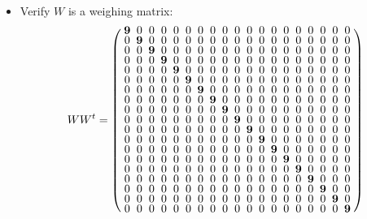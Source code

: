 \documentclass{beamer}
\begin{document}
\begin{frame}

  \begin{itemize}
  \item Verify $W$ is a weighing matrix:
    \[
      WW^t=
      \arraycolsep=2.5pt\def\arraystretch{0.625}
      \left(
        \begin{array}{ccccccccccccccccccc}
          \mathbf{9}&0&0&0&0&0&0&0&0&0&0&0&0&0&0&0&0&0&0\\
          0&\mathbf{9}&0&0&0&0&0&0&0&0&0&0&0&0&0&0&0&0&0\\
          0&0&\mathbf{9}&0&0&0&0&0&0&0&0&0&0&0&0&0&0&0&0\\
          0&0&0&\mathbf{9}&0&0&0&0&0&0&0&0&0&0&0&0&0&0&0\\
          0&0&0&0&\mathbf{9}&0&0&0&0&0&0&0&0&0&0&0&0&0&0\\
          0&0&0&0&0&\mathbf{9}&0&0&0&0&0&0&0&0&0&0&0&0&0\\
          0&0&0&0&0&0&\mathbf{9}&0&0&0&0&0&0&0&0&0&0&0&0\\
          0&0&0&0&0&0&0&\mathbf{9}&0&0&0&0&0&0&0&0&0&0&0\\
          0&0&0&0&0&0&0&0&\mathbf{9}&0&0&0&0&0&0&0&0&0&0\\
          0&0&0&0&0&0&0&0&0&\mathbf{9}&0&0&0&0&0&0&0&0&0\\
          0&0&0&0&0&0&0&0&0&0&\mathbf{9}&0&0&0&0&0&0&0&0\\
          0&0&0&0&0&0&0&0&0&0&0&\mathbf{9}&0&0&0&0&0&0&0\\
          0&0&0&0&0&0&0&0&0&0&0&0&\mathbf{9}&0&0&0&0&0&0\\
          0&0&0&0&0&0&0&0&0&0&0&0&0&\mathbf{9}&0&0&0&0&0\\
          0&0&0&0&0&0&0&0&0&0&0&0&0&0&\mathbf{9}&0&0&0&0\\
          0&0&0&0&0&0&0&0&0&0&0&0&0&0&0&\mathbf{9}&0&0&0\\
          0&0&0&0&0&0&0&0&0&0&0&0&0&0&0&0&\mathbf{9}&0&0\\
          0&0&0&0&0&0&0&0&0&0&0&0&0&0&0&0&0&\mathbf{9}&0\\
          0&0&0&0&0&0&0&0&0&0&0&0&0&0&0&0&0&0&\mathbf{9}\\
        \end{array}
      \right)
    \]
  \end{itemize}

\end{frame}

\end{document}
